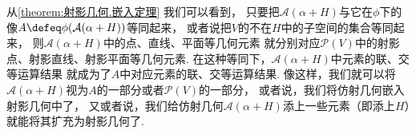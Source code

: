 \begin{remark}
从\cref{theorem:射影几何.嵌入定理} 我们可以看到，
只要把\(\mathcal{A}(\alpha + H)\)与它在\(\phi\)下的像\(A \defeq \phi(\mathcal{A}(\alpha + H))\)等同起来，
或者说把\(V\)的不在\(H\)中的子空间的集合等同起来，
则\(\mathcal{A}(\alpha + H)\)中的点、直线、平面等几何元素
就分别对应\(\mathcal{P}(V)\)中的射影点、射影直线、射影平面等几何元素.
在这种等同下，\(\mathcal{A}(\alpha + H)\)中元素的联、交等运算结果
就成为了\(A\)中对应元素的联、交等运算结果.
像这样，我们就可以将\(\mathcal{A}(\alpha + H)\)视为\(A\)的一部分或者\(\mathcal{P}(V)\)的一部分，
或者说，我们将仿射几何嵌入射影几何中了，
又或者说，我们给仿射几何\(\mathcal{A}(\alpha + H)\)添上一些元素（即添上\(H\)）就能将其扩充为射影几何了.
\end{remark}
